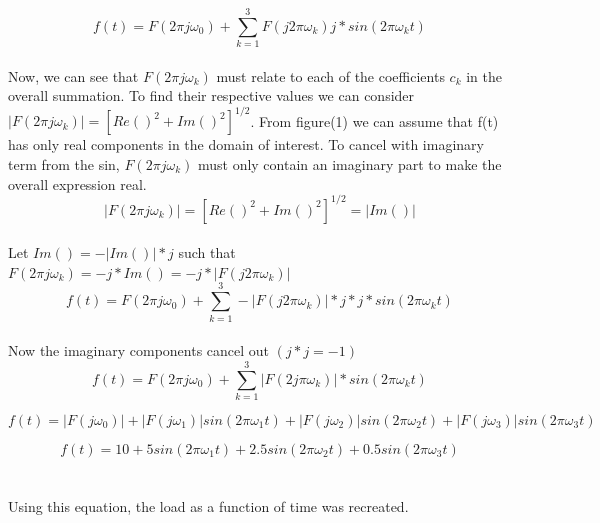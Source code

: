 \documentclass[10pt]{article}
\begin{document}
\[ f(t)=F(2\pi j \omega_0) + \sum_{k=1}^{3}F(j2\pi\omega_k)j*sin(2 \pi \omega_k t) \]
\\
Now, we can see that $F(2 \pi j \omega_k)$ must relate to each of the coefficients $c_k$ in the overall summation. To find their respective values we can consider $|F(2 \pi j \omega_k)|=\left[ Re()^2+Im()^2  \right]^{1/2}$. From figure(1) we can assume that f(t) has only real components in the domain of interest. To cancel with imaginary term from the sin, $F(2 \pi j \omega_k)$ must only contain an imaginary part to make the overall expression real. 
\[ |F(2 \pi j \omega_k)|=[Re()^2+Im()^2]^{1/2} = |Im()| \]
\\
Let $Im()=-|Im()|*j$ such that $F(2\pi j \omega_k)=-j*Im()=-j*|F(j2 \pi \omega_k)|$
\[ f(t)=F(2\pi j \omega_0) + \sum_{k=1}^{3}-|F(j2\pi\omega_k)|*j*j*sin(2 \pi \omega_k t) \]
\\
Now the imaginary components cancel out $(j*j=-1)$
\[ f(t)=F(2\pi j \omega_0) + \sum_{k=1}^{3}|F(2j\pi\omega_k)|*sin(2 \pi \omega_k t) \]

\[ f(t)=|F(j \omega_0)|+|F(j \omega_1)|sin(2 \pi \omega_1 t)+|F(j \omega_2)|sin(2 \pi \omega_2 t)+|F(j \omega_3)|sin(2 \pi \omega_3 t) \]

\[ f(t)= 10 +5 sin(2 \pi \omega_1 t)+  2.5 sin(2 \pi \omega_2 t)+ 0.5 sin(2 \pi \omega_3 t) \]
\\
\\
Using this equation, the load as a function of time was recreated.
\end{document}
